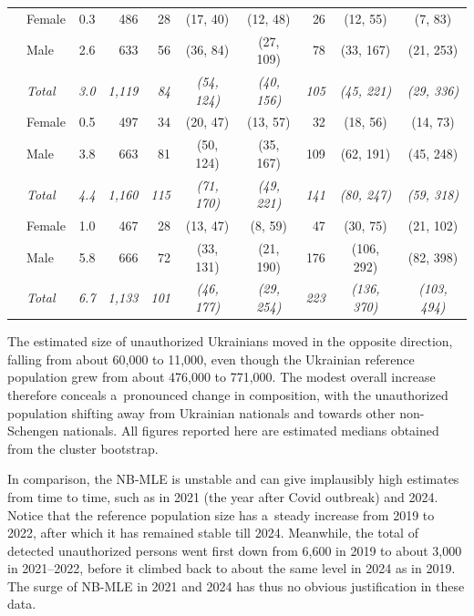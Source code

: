\begin{table}[H]
{\begin{tabular}{llrr rcc rcc}
\addlinespace
2022 & Female & 0.3 & 486 & 28 & (17, 40) & (12, 48) & 26 & (12, 55) & (7, 83) \\
 & Male & 2.6 & 633 & 56 & (36, 84) & (27, 109) & 78 & (33, 167) & (21, 253) \\
{\itshape } & {\itshape Total} & {\itshape 3.0} & {\itshape 1,119} & {\itshape 84} & {\itshape (54, 124)} & {\itshape (40, 156)} & {\itshape 105} & {\itshape (45, 221)} & {\itshape (29, 336)} \\
\addlinespace
2023 & Female & 0.5 & 497 & 34 & (20, 47) & (13, 57) & 32 & (18, 56) & (14, 73) \\
 & Male & 3.8 & 663 & 81 & (50, 124) & (35, 167) & 109 & (62, 191) & (45, 248) \\
{\itshape } & {\itshape Total} & {\itshape 4.4} & {\itshape 1,160} & {\itshape 115} & {\itshape (71, 170)} & {\itshape (49, 221)} & {\itshape 141} & {\itshape (80, 247)} & {\itshape (59, 318)} \\
\addlinespace
2024 & Female & 1.0 & 467 & 28 & (13, 47) & (8, 59) & 47 & (30, 75) & (21, 102) \\
 & Male & 5.8 & 666 & 72 & (33, 131) & (21, 190) & 176 & (106, 292) & (82, 398) \\
{\itshape } & {\itshape Total} & {\itshape 6.7} & {\itshape 1,133} & {\itshape 101} & {\itshape (46, 177)} & {\itshape (29, 254)} & {\itshape 223} & {\itshape (136, 370)} & {\itshape (103, 494)} \\
\bottomrule
\end{tabular}
}
\end{table}



The estimated size of unauthorized Ukrainians moved in the opposite direction, falling from about 60,000 to 11,000, even though the Ukrainian reference population grew from about 476,000 to 771,000. The modest overall increase therefore conceals a~pronounced change in composition, with the unauthorized population shifting away from Ukrainian nationals and towards other non-Schengen nationals. All figures reported here are estimated medians obtained from the cluster bootstrap.

In comparison, the NB-MLE is unstable and can give implausibly high estimates from time to time, such as in 2021 (the year after Covid outbreak) and 2024. Notice that the reference population size has a~steady increase from 2019 to 2022, after which it has remained stable till 2024. Meanwhile, the total of detected unauthorized persons went first down from 6,600 in 2019 to about 3,000 in 2021--2022, before it climbed back to about the same level in 2024 as in 2019. The surge of NB-MLE in 2021 and 2024 has thus no obvious justification in these data. 


